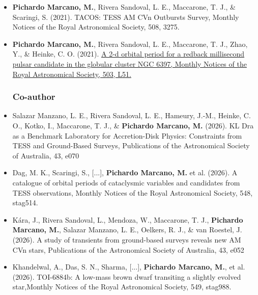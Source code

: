 \documentclass[letterpaper,10pt]{article}
\begin{document}
\begin{itemize}[label=$\blacktriangleright$]
        
        \item \textbf{Pichardo Marcano, M.}, Rivera Sandoval, L. E., Maccarone, T. J., \& Scaringi, S. (2021). TACOS: TESS AM CVn Outbursts Survey, Monthly Notices of the Royal Astronomical Society, 508, 3275.


        
                
            \item \textbf{Pichardo Marcano, M.}, Rivera Sandoval, L. E., Maccarone, T. J., Zhao, Y., \& Heinke, C. O. (2021). \href{https://ui.adsabs.harvard.edu/abs/2021MNRAS.503L..51P/abstract}{A 2-d orbital period for a redback millisecond pulsar candidate in the globular cluster NGC 6397, Monthly Notices of the Royal Astronomical Society, 503, L51.}


        \subsubsection*{Co-author}



\item Salazar Manzano, L. E., Rivera Sandoval, L. E., Hameury, J.-M., Heinke, C. O., Kotko, I., Maccarone, T. J., \& \textbf{Pichardo Marcano, M.} (2026). KL Dra as a Benchmark Laboratory for Accretion-Disk Physics: Constraints from TESS and Ground-Based Surveys, Publications of the Astronomical Society of Australia, 43, e070






\item Dag, M. K., Scaringi, S., [...], \textbf{Pichardo Marcano, M.} et al. (2026). A catalogue of orbital periods of cataclysmic variables and candidates from TESS observations, Monthly Notices of the Royal Astronomical Society, 548, stag514.






\item K\'ara, J., Rivera Sandoval, L., Mendoza, W., Maccarone, T. J., \textbf{Pichardo Marcano, M.}, Salazar Manzano, L. E., Oelkers, R. J., \& van Roestel, J. (2026). A study of transients from ground-based surveys reveals new AM CVn stars, Publications of the Astronomical Society of Australia, 43, e052



\item Khandelwal, A., Das, S. N., Sharma, [...], \textbf{Pichardo Marcano, M.}, et al. (2026). TOI-6884b: A low-mass brown dwarf transiting a slightly evolved star,Monthly Notices of the Royal Astronomical Society, 549, stag988.




\end{itemize}
\end{document}
